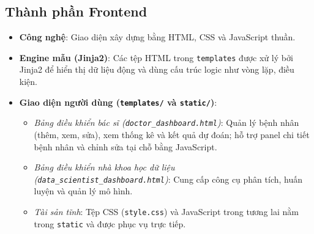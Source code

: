 ﻿\documentclass{article}
\begin{document}
\subsection{Thành phần Frontend}
\begin{itemize}
    \item \textbf{Công nghệ}: Giao diện xây dựng bằng HTML, CSS và JavaScript thuần.
    
    \item \textbf{Engine mẫu (Jinja2)}: Các tệp HTML trong \texttt{templates} được xử lý bởi Jinja2 để hiển thị dữ liệu động và dùng cấu trúc logic như vòng lặp, điều kiện.
    
    \item \textbf{Giao diện người dùng (\texttt{templates/} và \texttt{static/})}:
    \begin{itemize}
        \item \textit{Bảng điều khiển bác sĩ (\texttt{doctor\_dashboard.html})}: Quản lý bệnh nhân (thêm, xem, sửa), xem thống kê và kết quả dự đoán; hỗ trợ panel chi tiết bệnh nhân và chỉnh sửa tại chỗ bằng JavaScript.
        \item \textit{Bảng điều khiển nhà khoa học dữ liệu (\texttt{data\_scientist\_dashboard.html})}: Cung cấp công cụ phân tích, huấn luyện và quản lý mô hình.
        \item \textit{Tài sản tĩnh}: Tệp CSS (\texttt{style.css}) và JavaScript trong tương lai nằm trong \texttt{static} và được phục vụ trực tiếp.
    \end{itemize}
\end{itemize}
\end{document}
